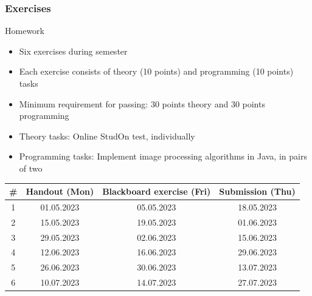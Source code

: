 \begin{frame}
	\frametitle{Exercises}
	\begin{block}{Homework}
		\begin{itemize}
			\item Six exercises during semester
			\item Each exercise consists of theory (10 points) and programming (10 points) tasks
			\item Minimum requirement for passing: 30 points theory and 30 points programming
			\item Theory tasks: Online StudOn test, individually
			\item Programming tasks: Implement image processing algorithms in Java, in pairs of two
		\end{itemize}
		\begin{center}
			\begin{tabular}{c | c | c | c}
				\# & Handout (Mon) & Blackboard exercise (Fri) & Submission (Thu) \\ \hline
				1  & 01.05.2023    & 05.05.2023                & 18.05.2023       \\
				2  & 15.05.2023    & 19.05.2023                & 01.06.2023       \\
				3  & 29.05.2023    & 02.06.2023                & 15.06.2023       \\
				4  & 12.06.2023    & 16.06.2023                & 29.06.2023       \\
				5  & 26.06.2023    & 30.06.2023                & 13.07.2023       \\
				6  & 10.07.2023    & 14.07.2023                & 27.07.2023       \\
			\end{tabular}
		\end{center}
	\end{block}
\end{frame}

